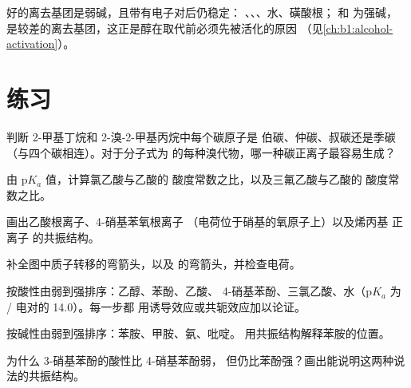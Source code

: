 好的离去基团是弱碱，且带有电子对后仍稳定：
、、、水、磺酸根； 和  为强碱，
是较差的离去基团，这正是醇在取代前必须先被活化的原因
（见\cref{ch:b1:alcohol-activation}）。

\section{练习}

\begin{exercise}[$\star$]\label{exo:b1:electronic-effects:1}
判断 2-甲基丁烷和 2-溴-2-甲基丙烷中每个碳原子是
伯碳、仲碳、叔碳还是季碳（与四个碳相连）。对于分子式为
 的每种溴代物，哪一种碳正离子最容易生成？
\end{exercise}

\begin{exercise}[$\star$]\label{exo:b1:electronic-effects:2}
由 $\mathrm{p}K_a$ 值，计算氯乙酸与乙酸的
酸度常数之比，以及三氟乙酸与乙酸的
酸度常数之比。
\end{exercise}

\begin{exercise}[$\star$]\label{exo:b1:electronic-effects:3}
画出乙酸根离子、4-硝基苯氧根离子
（电荷位于硝基的氧原子上）以及烯丙基
正离子  的共振结构。
\end{exercise}

\begin{exercise}[$\star$]\label{exo:b1:electronic-effects:4}
补全图中质子转移的弯箭头，以及
 的弯箭头，并检查电荷。
\end{exercise}

\begin{exercise}[$\star\star$]\label{exo:b1:electronic-effects:5}
按酸性由弱到强排序：乙醇、苯酚、乙酸、
4-硝基苯酚、三氯乙酸、水（$\mathrm{p}K_a$ 为
/ 电对的 14.0）。每一步都
用诱导效应或共轭效应加以论证。
\end{exercise}

\begin{exercise}[$\star\star$]\label{exo:b1:electronic-effects:6}
按碱性由弱到强排序：苯胺、甲胺、氨、吡啶。
用共振结构解释苯胺的位置。
\end{exercise}

\begin{exercise}[$\star\star$]\label{exo:b1:electronic-effects:7}
为什么 3-硝基苯酚的酸性比 4-硝基苯酚弱，
但仍比苯酚强？画出能说明这两种说法的共振结构。
\end{exercise}

